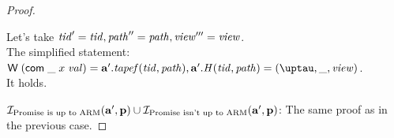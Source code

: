 \begin{proof}
\begin{itemize}
    Let's take $\mathit{tid}' = \mathit{tid}, \mathit{path}'' = \mathit{path}, \mathit{view}''' = \mathit{view}$.\\
    The simplified statement:
    $\tapeWrite{(\tapeWriteCommitted{\_}{x}{\stval})} = \aT'.\tapef(\tId, \cpath), \aT'.\hmap(\tId, \cpath) = (\tau, \_, \R)$. \\
    It holds.
  \end{itemize}

\noindent
$\mathcal{I}_{\textup{\rm Promise is up to ARM}}(\mathbf{a}', \mathbf{p}) \cup \mathcal{I}_{\textup{\rm Promise isn't up to ARM}}(\mathbf{a}', \mathbf{p})$: The same proof as in the previous case.
\end{proof}
